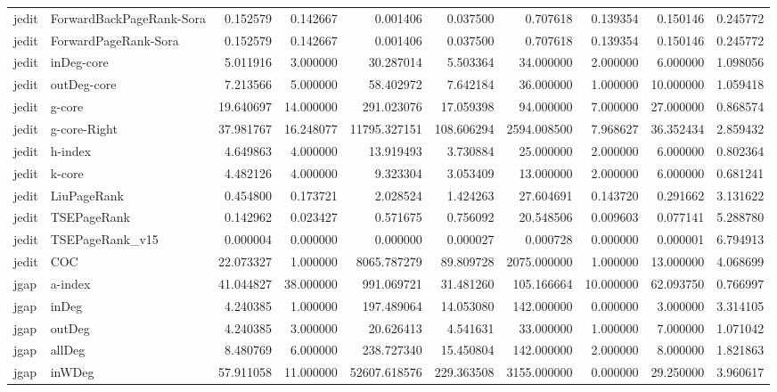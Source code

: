 \begin{tabular}{llrrrrrrrr}
jedit & ForwardBackPageRank-Sora & 0.152579 & 0.142667 & 0.001406 & 0.037500 & 0.707618 & 0.139354 & 0.150146 & 0.245772 \\
jedit & ForwardPageRank-Sora & 0.152579 & 0.142667 & 0.001406 & 0.037500 & 0.707618 & 0.139354 & 0.150146 & 0.245772 \\
jedit & inDeg-core & 5.011916 & 3.000000 & 30.287014 & 5.503364 & 34.000000 & 2.000000 & 6.000000 & 1.098056 \\
jedit & outDeg-core & 7.213566 & 5.000000 & 58.402972 & 7.642184 & 36.000000 & 1.000000 & 10.000000 & 1.059418 \\
jedit & g-core & 19.640697 & 14.000000 & 291.023076 & 17.059398 & 94.000000 & 7.000000 & 27.000000 & 0.868574 \\
jedit & g-core-Right & 37.981767 & 16.248077 & 11795.327151 & 108.606294 & 2594.008500 & 7.968627 & 36.352434 & 2.859432 \\
jedit & h-index & 4.649863 & 4.000000 & 13.919493 & 3.730884 & 25.000000 & 2.000000 & 6.000000 & 0.802364 \\
jedit & k-core & 4.482126 & 4.000000 & 9.323304 & 3.053409 & 13.000000 & 2.000000 & 6.000000 & 0.681241 \\
jedit & LiuPageRank & 0.454800 & 0.173721 & 2.028524 & 1.424263 & 27.604691 & 0.143720 & 0.291662 & 3.131622 \\
jedit & TSEPageRank & 0.142962 & 0.023427 & 0.571675 & 0.756092 & 20.548506 & 0.009603 & 0.077141 & 5.288780 \\
jedit & TSEPageRank_v15 & 0.000004 & 0.000000 & 0.000000 & 0.000027 & 0.000728 & 0.000000 & 0.000001 & 6.794913 \\
jedit & COC & 22.073327 & 1.000000 & 8065.787279 & 89.809728 & 2075.000000 & 1.000000 & 13.000000 & 4.068699 \\
jgap & a-index & 41.044827 & 38.000000 & 991.069721 & 31.481260 & 105.166664 & 10.000000 & 62.093750 & 0.766997 \\
jgap & inDeg & 4.240385 & 1.000000 & 197.489064 & 14.053080 & 142.000000 & 0.000000 & 3.000000 & 3.314105 \\
jgap & outDeg & 4.240385 & 3.000000 & 20.626413 & 4.541631 & 33.000000 & 1.000000 & 7.000000 & 1.071042 \\
jgap & allDeg & 8.480769 & 6.000000 & 238.727340 & 15.450804 & 142.000000 & 2.000000 & 8.000000 & 1.821863 \\
jgap & inWDeg & 57.911058 & 11.000000 & 52607.618576 & 229.363508 & 3155.000000 & 0.000000 & 29.250000 & 3.960617 \\

\end{tabular}

